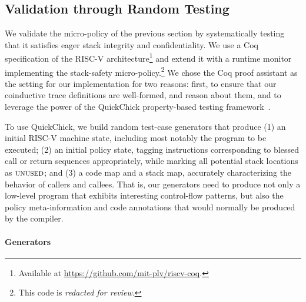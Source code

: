 \documentclass[acmsmall,review,anonymous]{acmart}\settopmatter{printfolios=true,printccs=false,printacmref=false}
\begin{document}
{%

\subsection{Validation through Random Testing}
\label{sec:testing}

We validate the micro-policy of the previous section by
systematically testing that it satisfies eager stack integrity and
confidentiality. We use a Coq specification of the RISC-V
architecture\footnote{Available at \url{https://github.com/mit-plv/riscv-coq}.}
and extend it with a
runtime monitor implementing the stack-safety
micro-policy.\footnote{This code is {\em redacted for review}.} We
  chose the Coq proof assistant as the setting for our implementation
  for two reasons: first, to ensure that our coinductive trace
  definitions are well-formed, and reason about them, and to leverage the power of the
  QuickChick property-based testing framework~\citep{Pierce:SF4}.

To use QuickChick, we build random test-case generators that produce
(1) an initial RISC-V machine state, including most notably
  the program to be executed;
(2)
  an initial policy state, tagging instructions corresponding to
  blessed call or return sequences appropriately, while marking
  all potential stack locations as $\textsc{unused}$; and
(3)
 a code map and a stack map, accurately characterizing the behavior
  of callers and callees.
%
That is, our generators need to produce not only a low-level program
that exhibits interesting control-flow patterns, but also the policy
meta-information and code annotations that would normally be produced
by the compiler.

\paragraph*{Generators}

}
\end{document}
